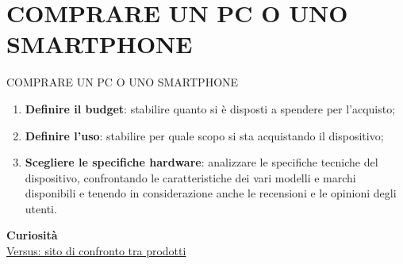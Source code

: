 \documentclass[aspectratio=1610]{beamer}
\begin{document}
\section{COMPRARE UN PC O UNO SMARTPHONE}

\begin{frame}{COMPRARE UN PC O UNO SMARTPHONE}
    \begin{enumerate}
        \justifying
        \item \textbf{Definire il budget}: stabilire quanto si è disposti a spendere per l'acquisto;
        \pause
        \item \textbf{Definire l'uso}: stabilire per quale scopo si sta acquistando il dispositivo;
        \pause 
        \item \textbf{Scegliere le specifiche hardware}: analizzare le specifiche tecniche del dispositivo, 
        confrontando le caratteristiche dei vari modelli e marchi disponibili e tenendo in considerazione 
        anche le recensioni e le opinioni degli utenti.
    \end{enumerate}
    \bigskip
    \tiny{\textbf{Curiosità}}\\
    \tiny{\href{https://versus.com/it}{Versus: sito di confronto tra prodotti}}
\end{frame}
\end{document}
